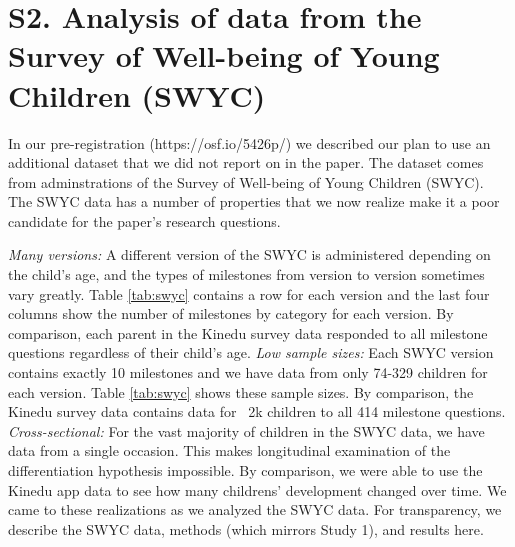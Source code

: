 \documentclass{article}
\begin{document}
\section{S2. Analysis of data from the Survey of Well-being of Young Children (SWYC)}

In our pre-registration (https://osf.io/5426p/) we described our plan to use an additional dataset that we did not report on in the paper. The dataset comes from adminstrations of the Survey of Well-being of Young Children (SWYC). The SWYC data has a number of properties that we now realize make it a poor candidate for the paper's research questions.

\textit{Many versions:} A different version of the SWYC is administered depending on the child's age, and the types of milestones from version to version sometimes vary greatly. Table \ref{tab:swyc} contains a row for each version and the last four columns show the number of milestones by category for each version. By comparison, each parent in the Kinedu survey data responded to all milestone questions regardless of their child's age.
\textit{Low sample sizes:} Each SWYC version contains exactly 10 milestones and we have data from only 74-329 children for each version. Table \ref{tab:swyc} shows these sample sizes. By comparison, the Kinedu survey data contains data for ~2k children to all 414 milestone questions.
\textit{Cross-sectional:} For the vast majority of children in the SWYC data, we have data from a single occasion. This makes longitudinal examination of the differentiation hypothesis impossible. By comparison, we were able to use the Kinedu app data to see how many childrens' development changed over time.
We came to these realizations as we analyzed the SWYC data. For transparency, we describe the SWYC data, methods (which mirrors Study 1), and results here.
\end{document}
